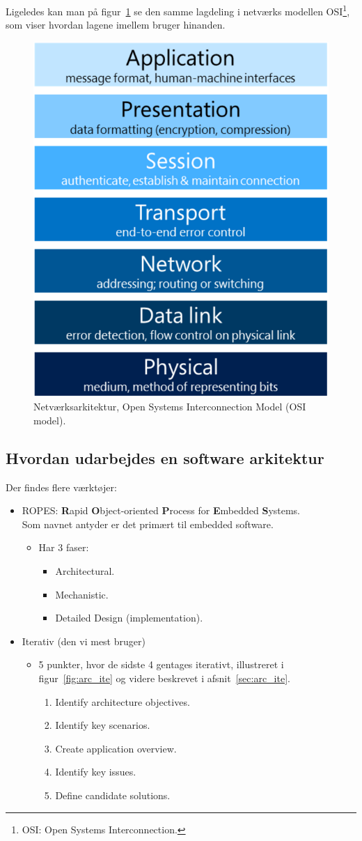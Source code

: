 Ligeledes kan man på figur~\ref{fig:osimodel} se den samme lagdeling i netværks modellen OSI\footnote{OSI: Open Systems Interconnection.}, som viser hvordan lagene imellem bruger hinanden.

\begin{figure}[h]
	\centering
	\includegraphics[width=0.5\linewidth]{figs/osimodel}
	\caption{Netværksarkitektur, Open Systems Interconnection Model (OSI model).}
	\label{fig:osimodel}
\end{figure}

\subsection{Hvordan udarbejdes en software arkitektur}
Der findes flere værktøjer:

\begin{itemize}
	\item ROPES: \textbf{R}apid \textbf{O}bject-oriented \textbf{P}rocess for \textbf{E}mbedded \textbf{S}ystems.\\
	Som navnet antyder er det primært til embedded software.
	\begin{itemize}
		\item Har 3 faser:
		\begin{itemize}
			\item Architectural.
			\item Mechanistic.
			\item Detailed Design (implementation).
		\end{itemize}
	\end{itemize}
	\item Iterativ (den vi mest bruger)
	\begin{itemize}
		\item 5 punkter, hvor de sidste 4 gentages iterativt, illustreret i figur~\ref{fig:arc_ite} og videre beskrevet i afsnit~\ref{sec:arc_ite}.
		\begin{enumerate}
			\item Identify architecture objectives.
			\item Identify key scenarios.
			\item Create application overview.
			\item Identify key issues.
			\item Define candidate solutions.
		\end{enumerate}
	\end{itemize}
\end{itemize}

